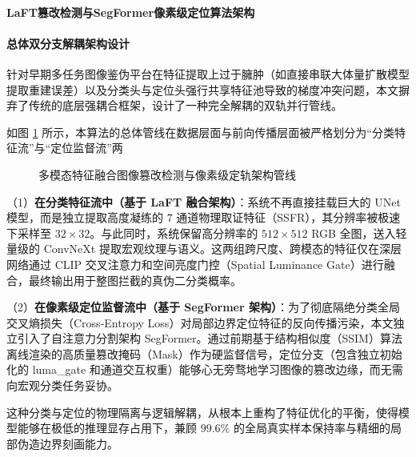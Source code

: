 \documentclass[10pt,a4paper,twocolumn]{ctexart}
\begin{document}
\paragraph{LaFT篡改检测与SegFormer像素级定位算法架构}

\paragraph{总体双分支解耦架构设计}
针对早期多任务图像鉴伪平台在特征提取上过于臃肿（如直接串联大体量扩散模型提取重建误差）以及分类头与定位头强行共享特征池导致的梯度冲突问题，本文摒弃了传统的底层强耦合框架，设计了一种完全解耦的双轨并行管线。

如图 \ref{fig:arch} 所示，本算法的总体管线在数据层面与前向传播层面被严格划分为“分类特征流”与“定位监督流”两\1

\begin{figure}[htbp]
    \centering
    \vspace{1em}
    \vspace{1em}
    \caption{多模态特征融合图像篡改检测与像素级定轨架构管线}
    \label{fig:arch}
\end{figure}

（1）\textbf{在分类特征流中（基于 LaFT 融合架构）}：系统不再直接挂载巨大的 UNet 模型，而是独立提取高度凝练的 $7$ 通道物理取证特征（SSFR），其分辨率被极速下采样至 $32 \times 32$。与此同时，系统保留高分辨率的 $512 \times 512$ RGB 全图，送入轻量级的 ConvNeXt 提取宏观纹理与语义。这两组跨尺度、跨模态的特征仅在深层网络通过 CLIP 交叉注意力和空间亮度门控（Spatial Luminance Gate）进行融合，最终输出用于整图拦截的真伪二分类概率。

（2）\textbf{在像素级定位监督流中（基于 SegFormer 架构）}：为了彻底隔绝分类全局交叉熵损失（Cross-Entropy Loss）对局部边界定位特征的反向传播污染，本文独立引入了自注意力分割架构 SegFormer。通过前期基于结构相似度（SSIM）算法离线渲染的高质量篡改掩码（Mask）作为硬监督信号，定位分支（包含独立初始化的 luma\_gate 和通道交互权重）能够心无旁骛地学习图像的篡改边缘，而无需向宏观分类任务妥协。

这种分类与定位的物理隔离与逻辑解耦，从根本上重构了特征优化的平衡，使得模型能够在极低的推理显存占用下，兼顾 $99.6\%$ 的全局真实样本保持率与精细的局部伪造边界刻画能力。
\end{document}
